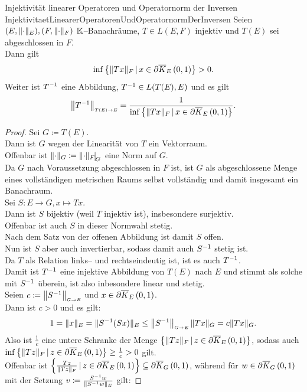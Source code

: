 \begin{satz}{Injektivität linearer Operatoren und Operatornorm der Inversen}
            {InjektivitaetLinearerOperatorenUndOperatornormDerInversen}
Seien $(E,\lVert\cdot\rVert_E),(F,\lVert\cdot\rVert_F)$ $\mathbb{K}$--Banachräume, $T\in L(E,F)$
injektiv und $T(E)$ sei abgeschlossen in $F$.\\
Dann gilt \[\inf\left\{\lVert Tx\rVert_F\,|\,x \in\partial \overline K_{E}\left(0, 1\right)\right\}>0\text.\]
Weiter ist $T^{-1}$ eine Abbildung, $T^{-1} \in L(T(E), E)$
und es gilt \[
\left\|T^{-1}\right\|_{\scriptscriptstyle{T(E) \rightarrow E}} 
   = \frac 1 {\inf\left\{\lVert Tx\rVert_F\,|\,x \in\partial \overline K_{E}\left(0, 1\right)\right\}}\text.
\]
\end{satz}
\begin{proof}
Sei $G\coloneqq T(E)$.\\
Dann ist $G$ wegen der Linearität von $T$ ein Vektorraum.\\
Offenbar ist $\norm\cdot_G\coloneqq \restrict{\norm\cdot_F}G$ eine Norm auf $G$.\\
Da $G$ nach Voraussetzung abgeschlossen in $F$ ist, ist $G$ als abgeschlossene
Menge eines vollständigen metrischen Raums selbst vollständig und damit
insgesamt ein Banachraum.\\
Sei $S : E \rightarrow G, x \mapsto Tx$.\\
Dann ist $S$ bijektiv (weil $T$ injektiv ist), insbesondere surjektiv.\\
Offenbar ist auch $S$ in dieser Normwahl stetig.\\
Nach dem Satz von der offenen Abbildung ist damit $S$ offen.\\
Nun ist $S$ aber auch invertierbar, sodass damit auch $S^{-1}$ stetig ist.\\
Da $T$ als Relation links-- und rechtseindeutig ist, ist es auch $T^{-1}$.\\
Damit ist $T^{-1}$ eine injektive Abbildung von $T(E)$ nach $E$ und stimmt als
solche mit $S^{-1}$ überein, ist also inbesondere linear und stetig.\\
Seien $c\coloneqq  \left\|S^{-1}\right\|_{\scriptscriptstyle{G \rightarrow E}}$ und $x \in \partial \overline K_{E}\left(0, 1\right)$.\\
Dann ist $c > 0$ und es gilt:
\[1 =\lVert x\rVert _E = \lVert S^{-1}(Sx)\rVert_E \le \left\|S^{-1}\right\|_{\scriptscriptstyle{G \rightarrow E}} \lVert Tx\rVert_G 
             = c \lVert Tx\rVert_G\text.\]
Also ist $\frac 1 c$ eine untere Schranke der Menge
$\left\{\lVert Tz\rVert_F\,|\,z\in\partial \overline K_{E}\left(0, 1\right)\right\}$, sodass auch
$\inf\left\{\lVert Tz\rVert_F\,|\,z\in\partial \overline K_{E}\left(0, 1\right)\right\} \ge \frac 1 c > 0$ gilt.\\
Offenbar ist 
$\left\{\frac{Tz}{\lVert Tz\rVert_F}\,|\,z \in \partial \overline K_{E}\left(0, 1\right)\right\} \subseteq \partial \overline K_{G}\left(0, 1\right)$,
während für $w \in \partial \overline K_{G}\left(0, 1\right)$ mit der Setzung 
$v\coloneqq \frac{S^{-1} w}{\lVert S^{-1} w\rVert_E}$ gilt:

\end{proof}
